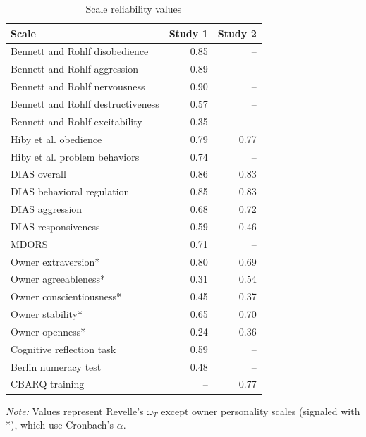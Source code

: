 \documentclass[
  doc]{apa6}
\begin{document}
\begin{table}[!h]

\caption{\label{tab:reliability}Scale reliability values}
\centering
\begin{threeparttable}
\begin{tabular}[t]{lrr}
\toprule
Scale & Study 1 & Study 2\\
\midrule
Bennett and Rohlf disobedience & 0.85 & --\\
Bennett and Rohlf aggression & 0.89 & --\\
Bennett and Rohlf nervousness & 0.90 & --\\
Bennett and Rohlf destructiveness & 0.57 & --\\
Bennett and Rohlf excitability & 0.35 & --\\
Hiby et al. obedience & 0.79 & 0.77\\
Hiby et al. problem behaviors & 0.74 & --\\
DIAS overall & 0.86 & 0.83\\
DIAS behavioral regulation & 0.85 & 0.83\\
DIAS aggression & 0.68 & 0.72\\
DIAS responsiveness & 0.59 & 0.46\\
MDORS & 0.71 & --\\
Owner extraversion* & 0.80 & 0.69\\
Owner agreeableness* & 0.31 & 0.54\\
Owner conscientiousness* & 0.45 & 0.37\\
Owner stability* & 0.65 & 0.70\\
Owner openness* & 0.24 & 0.36\\
Cognitive reflection task & 0.59 & --\\
Berlin numeracy test & 0.48 & --\\
CBARQ training & -- & 0.77\\
\bottomrule
\end{tabular}
\begin{tablenotes}
\item \newline\textit{Note: }  Values represent Revelle's $\omega_{T}$ except owner personality scales (signaled with *), which use Cronbach's $\alpha$. 
\end{tablenotes}
\end{threeparttable}
\end{table}

\clearpage
\end{document}
